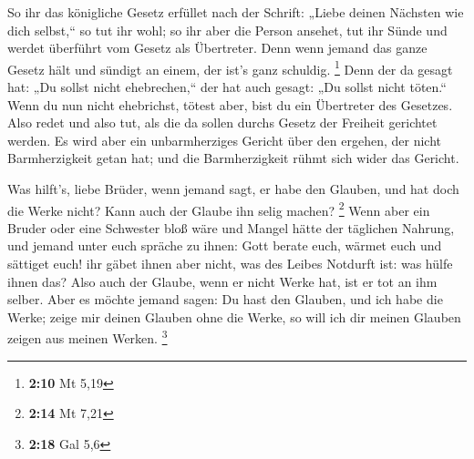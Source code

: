  So ihr das königliche Gesetz erfüllet nach der Schrift:
„Liebe deinen Nächsten wie dich selbst,`` so tut ihr wohl; 
so ihr aber die Person ansehet, tut ihr Sünde und werdet überführt vom
Gesetz als Übertreter.  Denn wenn jemand das ganze Gesetz
hält und sündigt an einem, der ist's ganz schuldig. \footnote{\textbf{2:10}
  Mt 5,19}  Denn der da gesagt hat: „Du sollst nicht
ehebrechen,`` der hat auch gesagt: „Du sollst nicht töten.`` Wenn du nun
nicht ehebrichst, tötest aber, bist du ein Übertreter des Gesetzes.
 Also redet und also tut, als die da sollen durchs Gesetz
der Freiheit gerichtet werden.  Es wird aber ein
unbarmherziges Gericht über den ergehen, der nicht Barmherzigkeit getan
hat; und die Barmherzigkeit rühmt sich wider das Gericht.

 Was hilft's, liebe Brüder, wenn jemand sagt, er habe den
Glauben, und hat doch die Werke nicht? Kann auch der Glaube ihn selig
machen? \footnote{\textbf{2:14} Mt 7,21}  Wenn aber ein
Bruder oder eine Schwester bloß wäre und Mangel hätte der täglichen
Nahrung,  und jemand unter euch spräche zu ihnen: Gott
berate euch, wärmet euch und sättiget euch! ihr gäbet ihnen aber nicht,
was des Leibes Notdurft ist: was hülfe ihnen das?  Also
auch der Glaube, wenn er nicht Werke hat, ist er tot an ihm selber.
 Aber es möchte jemand sagen: Du hast den Glauben, und ich
habe die Werke; zeige mir deinen Glauben ohne die Werke, so will ich dir
meinen Glauben zeigen aus meinen Werken. \footnote{\textbf{2:18} Gal 5,6}

